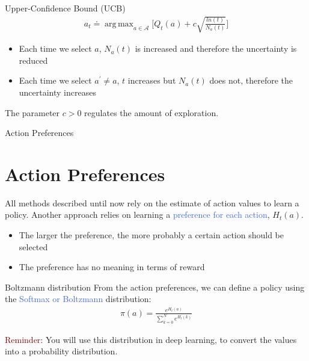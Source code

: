 \documentclass{beamer}
\DeclareMathOperator*{\argmax}{arg\,max}
\begin{document}
\begin{frame}{Upper-Confidence Bound (UCB)}
\begin{align*}
a_t \doteq \argmax_{a \in \mathcal{A}} \bigg [ Q_t(a) + c \sqrt{\frac{ln(t)}{N_a(t)}} \bigg ]
\end{align*}

\hspace{3mm}

\begin{itemize}
    \item Each time we select $a$, $N_a(t)$ is increased and therefore the uncertainty is reduced
    \item Each time we select $a^{\prime} \neq a$, $t$ increases but $N_a(t)$ does not, therefore the uncertainty increases
\end{itemize}

\hspace{2mm}

The parameter $c > 0$ regulates the amount of exploration.

\end{frame}


\begin{frame}{Action Preferences}
\section{Action Preferences}

All methods described until now rely on the estimate of action values to learn a policy.
Another approach relies on learning a \textcolor{RoyalBlue}{preference for each action}, $H_t(a)$.

\vspace{1mm}

\begin{itemize}
    \item The larger the preference, the more probably a certain action should be selected
    \item The preference has no meaning in terms of reward
\end{itemize}

\vspace{1mm}

\begin{block}{Boltzmann distribution}
From the action preferences, we can define a policy using the \textcolor{RoyalBlue}{Softmax or Boltzmann} distribution:
\begin{align*}
    \pi(a) = \frac{e^{H_t(a)}}{\sum_{k=0}^{N} e^{H_t(k)}}
    \end{align*}
\end{block}

\textcolor{Maroon}{Reminder}: You will use this distribution in deep learning, to convert the values into a probability distribution.

\end{frame}
\end{document}
